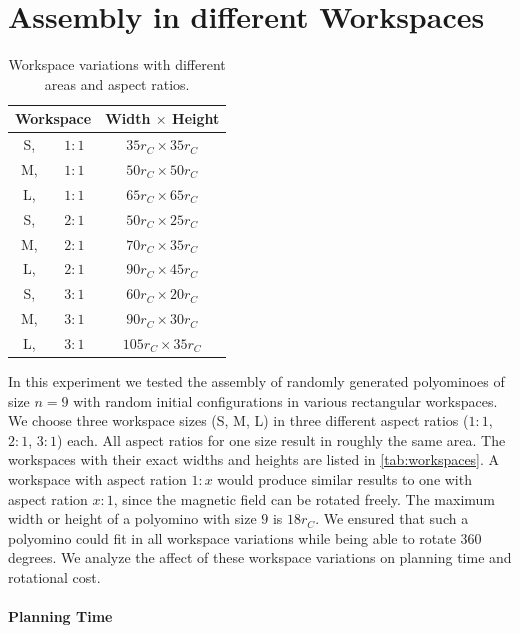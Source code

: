 \section{Assembly in different Workspaces}
\label{sec:AFBS}

\begin{table}
	\centering
	\begin{tabular}{|c c|c|}
		\hline
		\multicolumn{2}{|c|}{\textbf{Workspace}} & \textbf{Width $\times$ Height}\\
		\hline
		S,& $ 1:1 $ & $35 r_C \times 35 r_C$\\
		\hline
		M,& $ 1:1 $ & $50 r_C \times 50 r_C$ \\
		\hline
		L,& $ 1:1 $ & $65 r_C \times 65 r_C$ \\
		\hline
		S,& $ 2:1 $ & $50 r_C \times 25 r_C$\\
		\hline
		M,& $ 2:1 $ & $70 r_C \times 35 r_C$ \\
		\hline
		L,& $ 2:1 $ & $90 r_C \times 45 r_C$ \\
		\hline
		S,& $ 3:1 $ & $60 r_C \times 20 r_C$\\
		\hline
		M,& $ 3:1 $ & $90 r_C \times 30 r_C$ \\
		\hline
		L,& $ 3:1 $ & $105 r_C \times 35 r_C$ \\
		\hline
	\end{tabular}
	\caption{Workspace variations with different areas and aspect ratios.}
	\label{tab:workspaces}
\end{table}

In this experiment we tested the assembly of randomly generated polyominoes of size $n=9$ with random initial configurations in various rectangular workspaces.
We choose three workspace sizes (S, M, L) in three different aspect ratios ($ 1:1 $, $ 2:1 $, $ 3:1 $) each.
All aspect ratios for one size result in roughly the same area. The workspaces with their exact widths and heights are listed in \autoref{tab:workspaces}.
A workspace with aspect ration $ 1:x $ would produce similar results to one with aspect ration $ x:1 $, since the magnetic field can be rotated freely.
The maximum width or height of a polyomino with size $9$ is $18 r_C$.
We ensured that such a polyomino could fit in all workspace variations while being able to rotate 360 degrees.
We analyze the affect of these workspace variations on planning time and rotational cost.

\paragraph{Planning Time} 

